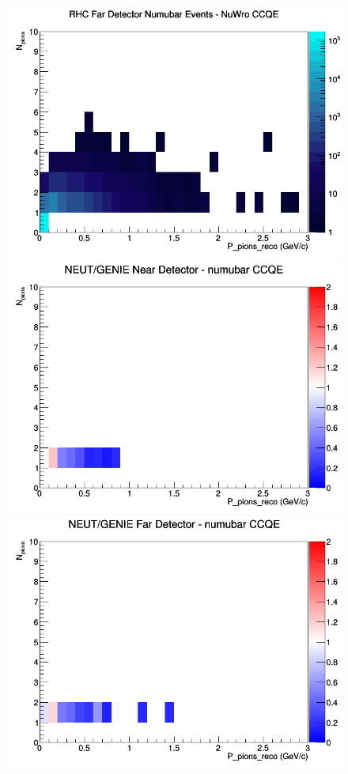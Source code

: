 \documentclass[12pt]{article}
\begin{document}
\begin{figure}[h]
\endminipage
{}
\includegraphics[width=\linewidth]{eff_N_P/LAr/pions/CCQE_RHC_FD_numubar_N_P_NuWro.png}
\endminipage
\newline
{}
\includegraphics[width=\linewidth]{eff_N_P/LAr/pions/ratios/CCQE_NEUT_GENIE_numubar_near_N_P.png}
\endminipage
{}
\includegraphics[width=\linewidth]{eff_N_P/LAr/pions/ratios/CCQE_NEUT_GENIE_numubar_far_N_P.png}

\end{figure}
\end{document}
